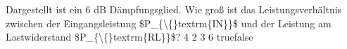     {Dargestellt ist ein 6 dB Dämpfungsglied. Wie groß ist das Leistungsverhältnis zwischen der Eingangsleistung \$P\_\{\textbackslash\{\}textrm\{IN\}\}\$ und der Leistung am Lastwiderstand \$P\_\{\textbackslash\{\}textrm\{RL\}\}\$?}
    {4}
    {2}
    {3}
    {6}
    {true}{false}